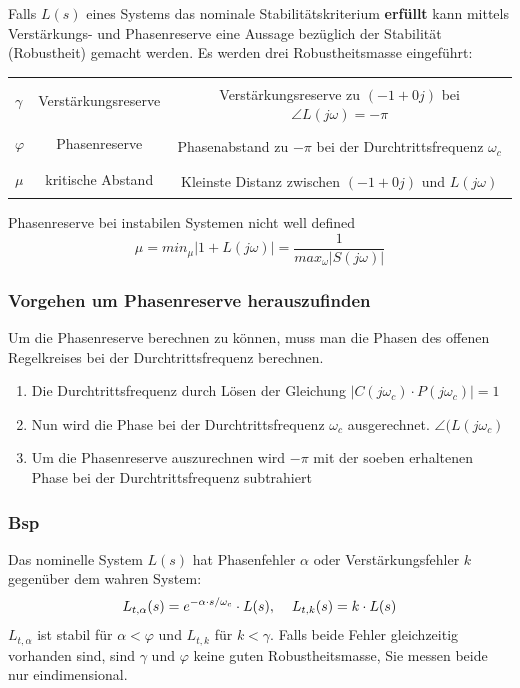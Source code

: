         Falls $L(s)$ eines Systems das nominale Stabilitätskriterium \textbf{erfüllt} kann mittels Verstärkungs- und Phasenreserve eine Aussage bezüglich der Stabilität (Robustheit) gemacht werden. 
\vfill\null\columnbreak
        Es werden drei Robustheitsmasse eingeführt:
        
        \begin{tabular}{|l|c|c|}
        \hline
        &&\\
        $\gamma$    & Verstärkungsreserve & \multirow{2}{14em}{Verstärkungsreserve zu $(-1+0j)$ bei $\angle L(j\omega) = -\pi$}\\
        &&\\
        \hline
        &&\\
        $\varphi$    & Phasenreserve& \multirow{2}{14em}{Phasenabstand zu $-\pi$ bei der Durchtrittsfrequenz $\omega_c$} \\
        &&\\
        \hline
        &&\\
        $\mu$ & kritische Abstand &\multirow{2}{14em}{Kleinste Distanz zwischen $(-1+0j)$ und $L(j\omega)$ } \\
        &&\\
        \hline
        \end{tabular}
        Phasenreserve bei instabilen Systemen nicht well defined
        \[\mu = min_{\mu} |1+L(j\omega)| = \frac{1}{max_\omega|S(j\omega)|}\]
        \subsubsection{Vorgehen um Phasenreserve herauszufinden}
        Um die Phasenreserve berechnen zu können, muss man die Phasen des offenen Regelkreises bei der Durchtrittsfrequenz berechnen.
        \begin{enumerate}
            \item Die Durchtrittsfrequenz durch Lösen der Gleichung $|C(j\omega_c)\cdot P(j\omega_c)| = 1$ 
            \item Nun wird die Phase bei der Durchtrittsfrequenz $\omega_c$ ausgerechnet. $\angle(L(j\omega_c)$
            \item Um die Phasenreserve auszurechnen wird $-\pi$ mit der soeben erhaltenen Phase bei der Durchtrittsfrequenz     subtrahiert
        \end{enumerate}
        
        \subsubsection{Bsp}
            Das nominelle System $L(s)$ hat Phasenfehler $\alpha$ oder Verstärkungsfehler $k$ gegenüber dem wahren System: 
            \[L_{t,\alpha}(s) = e^{-\alpha \cdot s / \omega_c}\cdot L(s), \hspace{4mm} L_{t,k}(s) = k\cdot L(s) \]
            $L_{t,\alpha}$ ist stabil für $\alpha <  \varphi$ und $L_{t,k}$ für $k<\gamma$. Falls beide Fehler gleichzeitig vorhanden sind, sind $\gamma$ und $\varphi$ keine guten Robustheitsmasse, Sie messen beide nur eindimensional.
                
